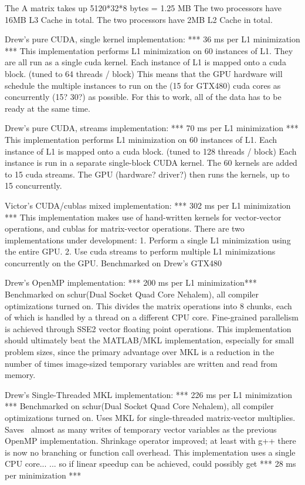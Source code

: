 \documentclass[10pt,twocolumn,letterpaper]{article}
\begin{document}
The A matrix takes up 5120*32*8 bytes = 1.25 MB
The two processors have 16MB L3 Cache in total.
The two processors have 2MB L2 Cache in total.

Drew's pure CUDA, single kernel implementation: *** 36 ms per L1 minimization ***
This implementation performs L1 minimization on 60 instances of L1.
They are all run as a single cuda kernel.  
Each instance of L1 is mapped onto a cuda block. (tuned to 64 threads / block)
This means that the GPU hardware will schedule the multiple instances to run
on the (15 for GTX480) cuda cores as concurrently (15? 30?) as possible.  
For this to work, all of the data has to be ready at the same time.

Drew's pure CUDA, streams implementation: *** 70 ms per L1 minimization ***
This implementation performs L1 minimization on 60 instances of L1.
Each instance of L1 is mapped onto a cuda block. (tuned to 128 threads / block)
Each instance is run in a separate single-block CUDA kernel.
The 60 kernels are added to 15 cuda streams.
The GPU (hardware? driver?) then runs the kernels, up to 15 concurrently.

Victor's CUDA/cublas mixed implementation: *** 302 ms per L1 minimization ***
This implementation makes use of hand-written kernels for vector-vector operations,
and cublas for matrix-vector operations.  There are two implementations under development:
1. Perform a single L1 minimization using the entire GPU.
2. Use cuda streams to perform multiple L1 minimizations concurrently on the GPU.
Benchmarked on Drew's GTX480

Drew's OpenMP implementation: *** 200 ms per L1 minimization***
Benchmarked on schur(Dual Socket Quad Core Nehalem), all compiler optimizations turned on.
This divides the matrix operations into 8 chunks, each of which is handled by a thread
on a different CPU core.  Fine-grained parallelism is achieved through SSE2 vector
floating point operations.  This implementation should ultimately beat the MATLAB/MKL
implementation, especially for small problem sizes, since the primary advantage
over MKL is a reduction in the number of times image-sized temporary variables
are written and read from memory. 

Drew's Single-Threaded MKL implementation: *** 226 ms per L1 minimization ***
Benchmarked on schur(Dual Socket Quad Core Nehalem), all compiler optimizations turned on.
Uses MKL for single-threaded matrix-vector multiplies.  
Saves ~almost as many writes of temporary vector variables as the previous OpenMP implementation.
Shrinkage operator improved; at least with g++ there is now no branching or function call overhead.
This implementation uses a single CPU core...
... so if linear speedup can be achieved, could possibly get *** 28 ms per minimization ***
\end{document}
